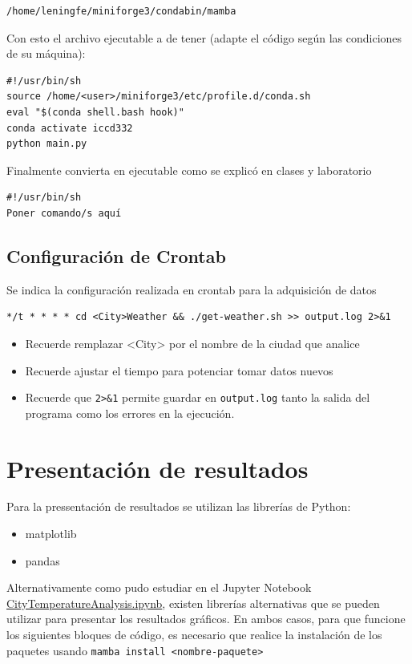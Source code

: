 \documentclass{article}
\begin{document}
\label{org5ab2057}
\begin{verbatim}
/home/leningfe/miniforge3/condabin/mamba
\end{verbatim}


Con esto el archivo ejecutable a de tener (adapte el código según las
condiciones de su máquina):

\begin{verbatim}
#!/usr/bin/sh
source /home/<user>/miniforge3/etc/profile.d/conda.sh
eval "$(conda shell.bash hook)"
conda activate iccd332
python main.py
\end{verbatim}

Finalmente convierta en ejecutable como se explicó en clases y laboratorio
\begin{verbatim}
#!/usr/bin/sh
Poner comando/s aquí
\end{verbatim}
\subsection{Configuración de Crontab}
\label{sec:orgb8403ce}
Se indica la configuración realizada en crontab para la adquisición de datos

\begin{verbatim}
*/t * * * * cd <City>Weather && ./get-weather.sh >> output.log 2>&1
\end{verbatim}

\begin{itemize}
\item Recuerde remplazar <City> por el nombre de la ciudad que analice
\item Recuerde ajustar el tiempo para potenciar tomar datos nuevos
\item Recuerde que \texttt{2>\&1} permite guardar en \texttt{output.log} tanto la salida
del programa como los errores en la ejecución.
\end{itemize}
\section{Presentación de resultados}
\label{sec:org9e7de3d}
Para la pressentación de resultados se utilizan las librerías de Python:
\begin{itemize}
\item matplotlib
\item pandas
\end{itemize}

Alternativamente como pudo estudiar en el Jupyter Notebook
\href{https://github.com/LeninGF/EPN-Lectures/blob/main/iccd332ArqComp-2024-A/Proyectos/CityWeather/CityTemperatureAnalysis.ipynb}{CityTemperatureAnalysis.ipynb}, existen librerías alternativas que se
pueden utilizar para presentar los resultados gráficos. En ambos
casos, para que funcione los siguientes bloques de código, es
necesario que realice la instalación de los paquetes usando \texttt{mamba
install <nombre-paquete>}
\end{document}
